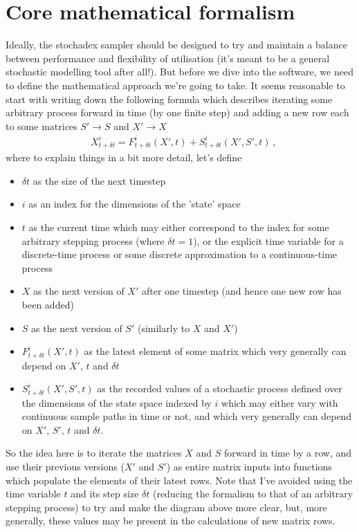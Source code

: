 \documentclass[sts]{imsart}
\begin{document}
\section*{Core mathematical formalism}

Ideally, the stochadex sampler should be designed to try and maintain a balance between performance and flexibility of utilisation (it's meant to be a general stochastic modelling tool after all!). But before we dive into the software, we need to define the mathematical approach we're going to take. It seems reasonable to start with writing down the following formula which describes iterating some arbitrary process forward in time (by one finite step) and adding a new row each to some matrices $S' \rightarrow S$ and $X' \rightarrow X$
\begin{align}
& X^i_{t+\delta t} = F^i_{t+\delta t}(X',t) + S^i_{t+\delta t}(X',S',t)\,,
\end{align}
where to explain things in a bit more detail, let's define

\begin{itemize}
\item[]{$\delta t$ as the size of the next timestep}
\item[]{$i$ as an index for the dimensions of the 'state' space}
\item[]{$t$ as the current time which may either correspond to the index for some arbitrary stepping process (where $\delta t = 1$), or the explicit time variable for a discrete-time process or some discrete approximation to a continuous-time process}
\item[]{$X$ as the next version of $X'$ after one timestep (and hence one new row has been added)}
\item[]{$S$ as the next version of $S'$ (similarly to $X$ and $X'$)}
\item[]{$F^i_{t+\delta t}(X', t)$ as the latest element of some matrix which very generally can depend on $X'$, $t$ and $\delta t$}
\item[]{$S^i_{t+\delta t}(X', S', t)$ as the recorded values of a stochastic process defined over the dimensions of the state space indexed by $i$ which may either vary with continuous sample paths in time or not, and which very generally can depend on $X'$, $S'$, $t$ and $\delta t$.}
\end{itemize}

So the idea here is to iterate the matrices $X$ and $S$ forward in time by a row, and use their previous versions ($X'$ and $S'$) as entire matrix inputs into functions which populate the elements of their latest rows. Note that I've avoided using the time variable $t$ and its step size $\delta t$ (reducing the formalism to that of an arbitrary stepping process) to try and make the diagram above more clear, but, more generally, these values may be present in the calculations of new matrix rows.
\end{document}
